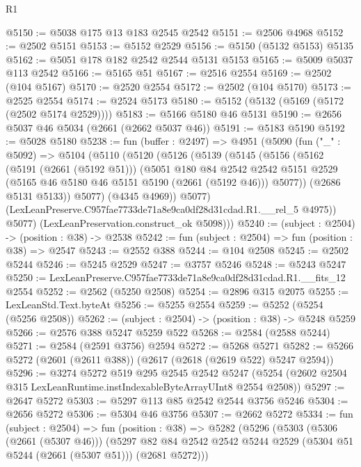 \begin{lexlean}{R1}
\begin{coremodule}
@5150 := @5038 @175 @13 @183 @2545 @2542
@5151 := @2506 @4968
@5152 := @2502 @5151
@5153 := @5152 @2529
@5156 := @5150 (@5132 @5153) @5135
@5162 := @5051 @178 @182 @2542 @2544 @5131 @5153
@5165 := @5009 @5037 @113 @2542
@5166 := @5165 @51
@5167 := @2516 @2554
@5169 := @2502 (@104 @5167)
@5170 := @2520 @2554
@5172 := @2502 (@104 @5170)
@5173 := @2525 @2554
@5174 := @2524 @5173
@5180 := @5152 (@5132 (@5169 (@5172 (@2502 @5174 @2529))))
@5183 := @5166 @5180 @46 @5131
@5190 := @2656 @5037 @46 @5034 (@2661 (@2662 @5037 @46))
@5191 := @5183 @5190
@5192 := @5028 @5180
@5238 := fun (buffer : @2497) =>
  @4951
    (@5090
      (fun ("_" : @5092) =>
      @5104
        (@5110
          (@5120
            (@5126
              (@5139
                (@5145
                  (@5156
                    (@5162
                      (@5191 (@2661 (@5192 @51)))
                      (@5051
                        @180
                        @84
                        @2542
                        @2542
                        @5151
                        @2529
                        (@5165 @46 @5180 @46 @5151 @5190 (@2661 (@5192 @46)))
                        @5077))
                    (@2686 @5131 @5133))
                  @5077)
                (@4345 @4969))
              @5077)
            (LexLeanPreserve.C957fae7733de71a8e9ca0df28d31cdad.R1.__rel_5 @4975))
          @5077)
        (LexLeanPreservation.construct_ok @5098)))
@5240 := (subject : @2504) -> (position : @38) -> @2538
@5242 := fun (subject : @2504) => fun (position : @38) => @2547
@5243 := @2552 @388
@5244 := @104 @2508
@5245 := @2502 @5244
@5246 := @5245 @2529
@5247 := @3757 @5246
@5248 := @5243 @5247
@5250 := LexLeanPreserve.C957fae7733de71a8e9ca0df28d31cdad.R1.__fits_12 @2554
@5252 := @2562 (@5250 @2508)
@5254 := @2896 @315 @2075
@5255 := LexLeanStd.Text.byteAt
@5256 := @5255 @2554
@5259 := @5252 (@5254 (@5256 @2508))
@5262 := (subject : @2504) -> (position : @38) -> @5248 @5259
@5266 := @2576 @388 @5247 @5259 @522
@5268 := @2584 (@2588 @5244)
@5271 := @2584 (@2591 @3756) @2594
@5272 := @5268 @5271
@5282 := @5266 @5272 (@2601 (@2611 @388)) (@2617 (@2618 (@2619 @522) @5247 @2594))
@5296 := @3274
    @5272
    @519
    @295
    @2545
    @2542
    @5247
    (@5254 (@2602 @2504 @315 LexLeanRuntime.instIndexableByteArrayUInt8 @2554 @2508))
@5297 := @2647 @5272
@5303 := @5297 @113 @85 @2542 @2544 @3756 @5246
@5304 := @2656 @5272
@5306 := @5304 @46 @3756
@5307 := @2662 @5272
@5334 := fun (subject : @2504) =>
  fun (position : @38) =>
  @5282
    (@5296
      (@5303
        (@5306 (@2661 (@5307 @46)))
        (@5297 @82 @84 @2542 @2542 @5244 @2529 (@5304 @51 @5244 (@2661 (@5307 @51))) (@2681 @5272)))

\end{coremodule}
\end{lexlean}
